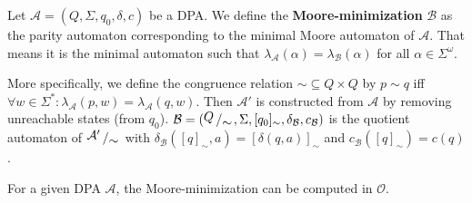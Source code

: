 \newpage








	


\begin{defn}
	Let $\mathcal{A} = (Q, \Sigma, q_0, \delta, c)$ be a DPA. We define the \textbf{Moore-minimization} $\mathcal{B}$ as the parity automaton corresponding to the minimal Moore automaton of $\mathcal{A}$. That means it is the minimal automaton such that $\lambda_\mathcal{A}(\alpha) = \lambda_\mathcal{B}(\alpha)$ for all $\alpha \in \Sigma^\omega$.
	
	More specifically, we define the congruence relation $\sim \subseteq Q \times Q$ by $p \sim q$ iff $\forall w \in \Sigma^*: \lambda_\mathcal{A}(p, w) = \lambda_\mathcal{A}(q, w)$. Then $\mathcal{A}'$ is constructed from $\mathcal{A}$ by removing unreachable states (from $q_0$). $\mathcal{B} = (\bigslant{Q}{\sim}, \Sigma, [q_0]_\sim, \delta_\mathcal{B}, c_\mathcal{B})$ is the quotient automaton of $\bigslant{\mathcal{A}'}{\sim}$ with $\delta_\mathcal{B}([q]_\sim, a) = [\delta(q, a)]_\sim$ and $c_\mathcal{B}([q]_\sim) = c(q)$.
\end{defn}

\begin{lem}
	For a given DPA $\mathcal{A}$, the Moore-minimization can be computed in $\mathcal{O}$.
\end{lem}





